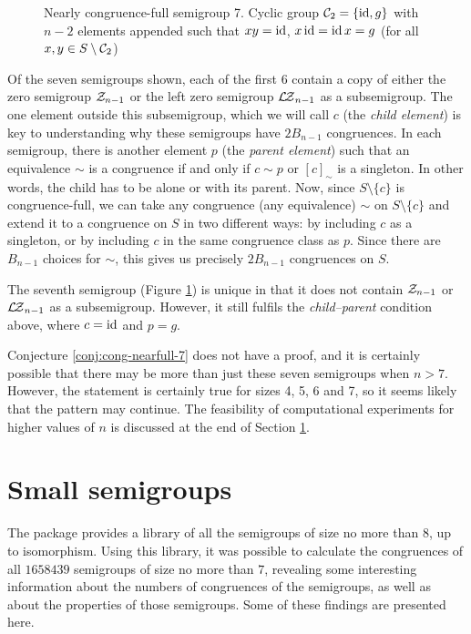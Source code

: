 \begin{figure}[t]
  \centering
  
  \caption[Nearly congruence-full semigroup 7]{Nearly congruence-full semigroup
    7.  Cyclic group $\mathcal{C}_2 = \{\operatorname{id}, g\}$ with $n-2$ elements appended such
    that $xy=\operatorname{id}$, $x \operatorname{id}=\operatorname{id} x=g$ (for all $x,y \in S \setminus \mathcal{C}_2$)}
  \label{fig:nearfull-7}
\end{figure}

Of the seven semigroups shown, each of the first 6 contain a copy of either the zero
semigroup $\mathcal{Z}_{n-1}$ or the left zero semigroup $\mathcal{L\!Z}_{n-1}$ as a subsemigroup.
The one element outside this subsemigroup, which we will call $c$ (the
\textit{child element}) is key to understanding why these semigroups have
$2B_{n-1}$ congruences.  In each semigroup, there is another element $p$ (the
\textit{parent element}) such that an equivalence $\sim$ is a congruence if and
only if $c \sim p$ or $[c]_\sim$ is a singleton.  In other words, the child has
to be alone or with its parent.  Now, since $S \setminus \{c\}$ is
congruence-full, we can take any congruence (any equivalence) $\sim$ on
$S \setminus \{c\}$ and extend it to a congruence on $S$ in two different ways:
by including $c$ as a singleton, or by including $c$ in the same congruence
class as $p$.  Since there are $B_{n-1}$ choices for $\sim$, this gives us
precisely $2B_{n-1}$ congruences on $S$.

The seventh semigroup (Figure \ref{fig:nearfull-7}) is unique in that it does
not contain $\mathcal{Z}_{n-1}$ or $\mathcal{L\!Z}_{n-1}$ as a subsemigroup.  However, it still
fulfils the \textit{child--parent} condition above, where $c = \operatorname{id}$ and $p = g$.

Conjecture \ref{conj:cong-nearfull-7} does not have a proof, and it is certainly
possible that there may be more than just these seven semigroups when $n > 7$.
However, the statement is certainly true for sizes 4, 5, 6 and 7, so it seems
likely that the pattern may continue.  The feasibility of computational
experiments for higher values of $n$ is discussed at the end of Section
\ref{sec:smallsemi}.

\section{Small semigroups}
\label{sec:smallsemi}
The \smallsemi{} package \cite{smallsemi} provides a library of all the
semigroups of size no more than $8$, up to isomorphism.
Using this library, it was possible to calculate the congruences of all
$1658439$ semigroups of size no more than $7$, revealing some interesting
information about the numbers of congruences of the semigroups, as well as about
the properties of those semigroups.  Some of these findings are presented here.

